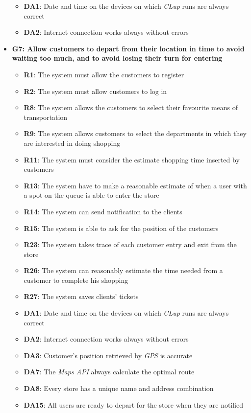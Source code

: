 \documentclass{article}
\begin{document}
\begin{itemize}
\begin{itemize}
						\item {\bfseries DA1}: Date and time on the devices on which \emph{CLup} runs are always correct
						\item {\bfseries DA2}: Internet connection works always without errors
							
					\end{itemize}

				 
				
				\item {\bfseries G7: Allow customers to depart from their location in time to avoid waiting too much, and to avoid losing their turn for entering}	

					\begin{itemize}
						\item {\bfseries R1}: The system must allow the customers to register
						\item {\bfseries R2}: The system must allow customers to log in
						\item {\bfseries R8}: The system allows the customers to select their favourite means of transportation
						\item {\bfseries R9}: The system allows customers to select the departments in which they are interested in doing shopping
						\item {\bfseries R11}: The system must consider the estimate shopping time inserted by customers
						\item {\bfseries R13}: The system have to make a reasonable estimate of when a user with a spot on the queue is able to enter the store
						\item {\bfseries R14}: The system can send notification to the clients
						\item {\bfseries R15}: The system is able to ask for the position of the customers
						\item {\bfseries R23}: The system takes trace of each customer entry and exit from the store
						\item {\bfseries R26}: The system can reasonably estimate the time needed from a customer to complete his shopping
						\item {\bfseries R27}: The system saves clients' tickets \\
					
						\item {\bfseries DA1}: Date and time on the devices on which \emph{CLup} runs are always correct
						\item {\bfseries DA2}: Internet connection works always without errors
						\item{\bfseries DA3}: Customer’s position retrieved by \emph{GPS} is accurate
						\item {\bfseries DA7}: The \emph{Maps API} always calculate the optimal route 
						\item {\bfseries DA8}: Every store has a unique name and address combination
						\item{\bfseries DA15}: All users are ready to depart for the store when they are notified
							

\end{itemize}
\end{itemize}
\end{document}
